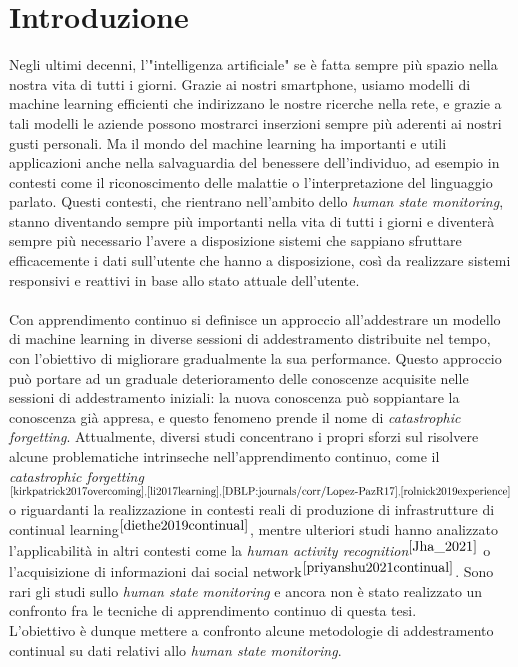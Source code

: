 \chapter*{Introduzione}

Negli ultimi decenni, l'"intelligenza artificiale" se è fatta sempre più spazio nella nostra vita di tutti i giorni. Grazie ai nostri smartphone, usiamo modelli di machine learning efficienti che indirizzano le nostre ricerche nella rete, e grazie a tali modelli le aziende possono mostrarci inserzioni sempre più aderenti ai nostri gusti personali. Ma il mondo del machine learning ha importanti e utili applicazioni anche nella salvaguardia del benessere dell'individuo, ad esempio in contesti come il riconoscimento delle malattie o l'interpretazione del linguaggio parlato. Questi contesti, che rientrano nell'ambito dello \textit{human state monitoring}, stanno diventando sempre più importanti nella vita di tutti i giorni e diventerà sempre più necessario l'avere a disposizione sistemi che sappiano sfruttare efficacemente i dati sull'utente che hanno a disposizione, così da realizzare sistemi responsivi e reattivi in base allo stato attuale dell'utente.\\\\
Con apprendimento continuo si definisce un approccio all'addestrare un modello di machine learning in diverse sessioni di addestramento distribuite nel tempo, con l'obiettivo di migliorare gradualmente la sua performance. Questo approccio può portare ad un graduale deterioramento delle conoscenze acquisite nelle sessioni di addestramento iniziali: la nuova conoscenza può soppiantare la conoscenza già appresa, e questo fenomeno prende il nome di \textit{catastrophic forgetting}. Attualmente, diversi studi concentrano i propri sforzi sul risolvere alcune problematiche intrinseche nell'apprendimento continuo, come il \textit{catastrophic forgetting}$^{\cite{kirkpatrick2017overcoming},\cite{li2017learning},\cite{DBLP:journals/corr/Lopez-PazR17},\cite{rolnick2019experience}}$ o riguardanti la realizzazione in contesti reali di produzione di infrastrutture di continual learning$^{\cite{diethe2019continual}}$, mentre ulteriori studi hanno analizzato l'applicabilità in altri contesti come la \textit{human activity recognition}$^{\cite{Jha_2021}}$ o l'acquisizione di informazioni dai social network$^{\cite{priyanshu2021continual}}$. Sono rari gli studi sullo \textit{human state monitoring} e ancora non è stato realizzato un confronto fra le tecniche di apprendimento continuo di questa tesi.\\
L'obiettivo è dunque mettere a confronto alcune metodologie di addestramento continual su dati relativi allo \textit{human state monitoring}.
